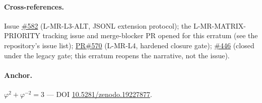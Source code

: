 \paragraph{Cross-references.}
Issue \href{https://github.com/gHashTag/trios/issues/582}{\#582}
(L-MR-L3-ALT, JSONL extension protocol);
the L-MR-MATRIX-PRIORITY tracking issue and merge-blocker PR
opened for this erratum (see the repository's issue list);
\href{https://github.com/gHashTag/trios/pull/570}{PR\#570}
(L-MR-L4, hardened closure gate);
\href{https://github.com/gHashTag/trios/issues/446}{\#446}
(closed under the legacy gate; this erratum reopens the
narrative, not the issue).

\paragraph{Anchor.}
$\varphi^{2} + \varphi^{-2} = 3$ ---
DOI \href{https://doi.org/10.5281/zenodo.19227877}{10.5281/zenodo.19227877}.

% 
